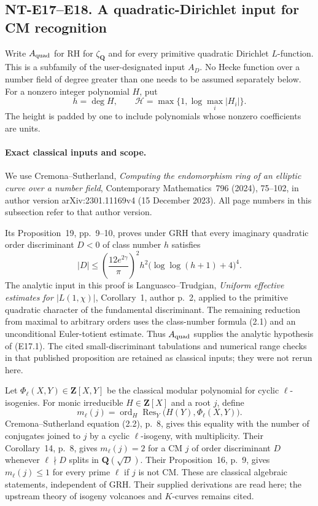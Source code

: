 \subsection*{NT-E17--E18. A quadratic-Dirichlet input for CM recognition}

Write $A_{\rm quad}$ for RH for $\zeta_{\mathbf Q}$ and
for every primitive quadratic Dirichlet $L$-function.
This is a subfamily of the user-designated input $A_D$.
No Hecke function over a number field of degree greater
than one needs to be assumed separately below.
For a nonzero integer polynomial $H$, put
\[
 h=\deg H,\qquad
 \mathcal H=\max\{1,\log\max_i|H_i|\}.
\]
The height is padded by one to include polynomials
whose nonzero coefficients are units.

\paragraph{Exact classical inputs and scope.}
We use Cremona--Sutherland,
\emph{Computing the endomorphism ring of an elliptic
curve over a number field}, Contemporary Mathematics~796
(2024), 75--102, in author version
arXiv:2301.11169v4 (15 December 2023).
All page numbers in this subsection refer to that
author version.

Its Proposition~19, pp.~9--10, proves under GRH that
every imaginary quadratic order discriminant $D<0$
of class number $h$ satisfies
\[
 |D|\le
 \left(\frac{12e^{2\gamma}}{\pi}\right)^2
 h^2\bigl(\log\log(h+1)+4\bigr)^4.
 \tag{E17.1}
\]
The analytic input in this proof is
Languasco--Trudgian, \emph{Uniform effective estimates
for $|L(1,\chi)|$}, Corollary~1, author p.~2,
applied to the primitive quadratic character of the
fundamental discriminant.
The remaining reduction from maximal to arbitrary
orders uses the class-number formula (2.1) and an
unconditional Euler-totient estimate.
Thus $A_{\rm quad}$ supplies the analytic hypothesis
of (E17.1). The cited small-discriminant
tabulations and numerical range checks in that
published proposition are retained as classical
inputs; they were not rerun here.

Let $\Phi_\ell(X,Y)\in\mathbf Z[X,Y]$ be the classical
modular polynomial for cyclic $\ell$-isogenies.
For monic irreducible $H\in\mathbf Z[X]$ and a root $j$,
define
\[
 m_\ell(j)=
 \operatorname{ord}_H
    \operatorname{Res}_Y\bigl(H(Y),\Phi_\ell(X,Y)\bigr).
 \tag{E17.2}
\]
Cremona--Sutherland equation (2.2), p.~8, gives
this equality with the number of conjugates joined
to $j$ by a cyclic $\ell$-isogeny, with multiplicity.
Their Corollary~14, p.~8, gives $m_\ell(j)=2$
for a CM $j$ of order discriminant $D$ whenever
$\ell\nmid D$ splits in $\mathbf Q(\sqrt D)$.
Their Proposition~16, p.~9, gives
$m_\ell(j)\le1$ for every prime $\ell$ if $j$ is not CM.
These are classical algebraic statements, independent
of GRH. Their supplied derivations are read here;
the upstream theory of isogeny volcanoes and
$K$-curves remains cited.

